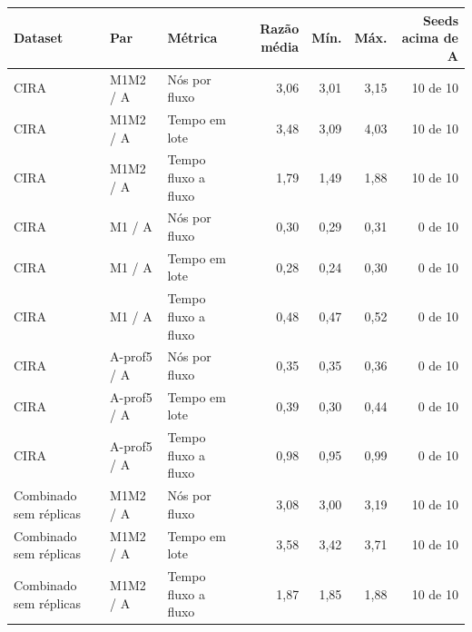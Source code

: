 \begin{tabular}{lllrrrr}
\hline
\textbf{Dataset} & \textbf{Par} & \textbf{Métrica} & \textbf{Razão média} & \textbf{Mín.} & \textbf{Máx.} & \textbf{Seeds acima de A} \\ \hline
CIRA & M1M2 / A & Nós por fluxo & 3,06 & 3,01 & 3,15 & 10 de 10 \\
CIRA & M1M2 / A & Tempo em lote & 3,48 & 3,09 & 4,03 & 10 de 10 \\
CIRA & M1M2 / A & Tempo fluxo a fluxo & 1,79 & 1,49 & 1,88 & 10 de 10 \\
CIRA & M1 / A & Nós por fluxo & 0,30 & 0,29 & 0,31 & 0 de 10 \\
CIRA & M1 / A & Tempo em lote & 0,28 & 0,24 & 0,30 & 0 de 10 \\
CIRA & M1 / A & Tempo fluxo a fluxo & 0,48 & 0,47 & 0,52 & 0 de 10 \\
CIRA & A-prof5 / A & Nós por fluxo & 0,35 & 0,35 & 0,36 & 0 de 10 \\
CIRA & A-prof5 / A & Tempo em lote & 0,39 & 0,30 & 0,44 & 0 de 10 \\
CIRA & A-prof5 / A & Tempo fluxo a fluxo & 0,98 & 0,95 & 0,99 & 0 de 10 \\
\hline
Combinado sem réplicas & M1M2 / A & Nós por fluxo & 3,08 & 3,00 & 3,19 & 10 de 10 \\
Combinado sem réplicas & M1M2 / A & Tempo em lote & 3,58 & 3,42 & 3,71 & 10 de 10 \\
Combinado sem réplicas & M1M2 / A & Tempo fluxo a fluxo & 1,87 & 1,85 & 1,88 & 10 de 10 \\
\hline
\end{tabular}
